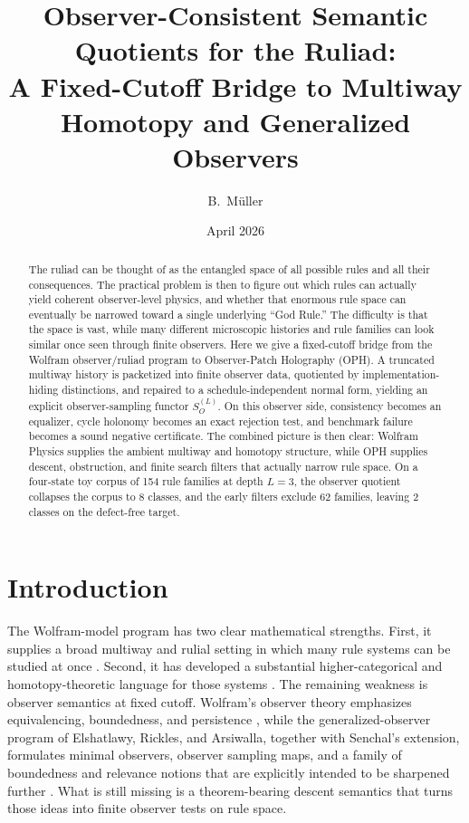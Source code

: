 \documentclass[11pt]{article}
\title{Observer-Consistent Semantic Quotients for the Ruliad:\\
A Fixed-Cutoff Bridge to Multiway Homotopy and Generalized Observers}
\author{B.\ M\"uller}
\date{April 2026}
\theoremstyle{remark}
\theoremstyle{plain}
\begin{document}
\maketitle

\begin{abstract}
The ruliad can be thought of as the entangled space of all possible rules and all their consequences. The practical problem is then to figure out which rules can actually yield coherent observer-level physics, and whether that enormous rule space can eventually be narrowed toward a single underlying ``God Rule.'' The difficulty is that the space is vast, while many different microscopic histories and rule families can look similar once seen through finite observers. Here we give a fixed-cutoff bridge from the Wolfram observer/ruliad program to Observer-Patch Holography (OPH). A truncated multiway history is packetized into finite observer data, quotiented by implementation-hiding distinctions, and repaired to a schedule-independent normal form, yielding an explicit observer-sampling functor \(S_O^{(L)}\). On this observer side, consistency becomes an equalizer, cycle holonomy becomes an exact rejection test, and benchmark failure becomes a sound negative certificate. The combined picture is then clear: Wolfram Physics supplies the ambient multiway and homotopy structure, while OPH supplies descent, obstruction, and finite search filters that actually narrow rule space. On a four-state toy corpus of 154 rule families at depth \(L=3\), the observer quotient collapses the corpus to 8 classes, and the early filters exclude 62 families, leaving 2 classes on the defect-free target.
\end{abstract}

\section{Introduction}

The Wolfram-model program has two clear mathematical strengths. First, it supplies a broad multiway and rulial setting in which many rule systems can be studied at once \cite{wolfram2021ruliad,rickles2023}. Second, it has developed a substantial higher-categorical and homotopy-theoretic language for those systems \cite{arsiwalla2021nfold,arsiwalla2021pregeometric,gorard2023functorial}. The remaining weakness is observer semantics at fixed cutoff. Wolfram's observer theory emphasizes equivalencing, boundedness, and persistence \cite{wolfram2023observer}, while the generalized-observer program of Elshatlawy, Rickles, and Arsiwalla, together with Senchal's extension, formulates minimal observers, observer sampling maps, and a family of boundedness and relevance notions that are explicitly intended to be sharpened further \cite{elshatlawy2025gto,senchal2025}. What is still missing is a theorem-bearing descent semantics that turns those ideas into finite observer tests on rule space.
\end{document}
